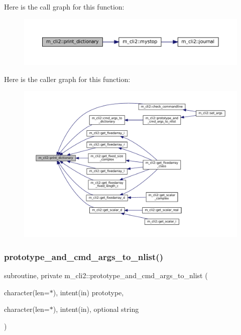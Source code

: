 Here is the call graph for this function\+:
\nopagebreak
\begin{figure}[H]
\begin{center}
\leavevmode
\includegraphics[width=350pt]{namespacem__cli2_af7dc9c4b19e394533df4a8ef42fa111b_cgraph}
\end{center}
\end{figure}
Here is the caller graph for this function\+:
\nopagebreak
\begin{figure}[H]
\begin{center}
\leavevmode
\includegraphics[width=350pt]{namespacem__cli2_af7dc9c4b19e394533df4a8ef42fa111b_icgraph}
\end{center}
\end{figure}
\mbox{\label{namespacem__cli2_a06f8bb6dd63fd7ac2a91b46ee89baaa9}} 
\subsubsection{\texorpdfstring{prototype\+\_\+and\+\_\+cmd\+\_\+args\+\_\+to\+\_\+nlist()}{prototype\_and\_cmd\_args\_to\_nlist()}}
{\footnotesize\ttfamily subroutine, private m\+\_\+cli2\+::prototype\+\_\+and\+\_\+cmd\+\_\+args\+\_\+to\+\_\+nlist (\begin{DoxyParamCaption}\item[{character(len=$\ast$), intent(in)}]{prototype,  }\item[{character(len=$\ast$), intent(in), optional}]{string }\end{DoxyParamCaption})\hspace{0.3cm}{\ttfamily [private]}}



